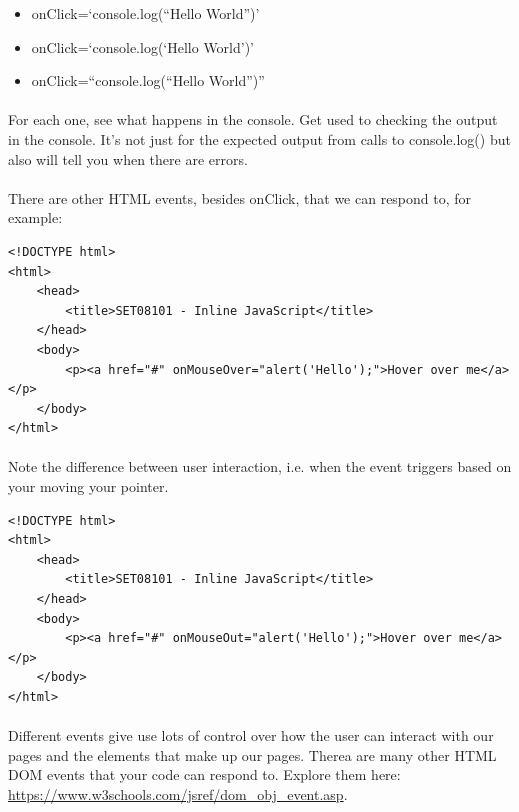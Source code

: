\documentclass[10pt, a4paper, twosize]{article}
\begin{document}
\begin{itemize}
\item onClick=`console.log(``Hello World'')'
\item onClick=`console.log(`Hello World')'
\item onClick=``console.log(``Hello World'')''
\end{itemize}

\paragraph{} For each one, see what happens in the console. Get used to checking the output in the console. It's not just for the expected output from calls to console.log() but also will tell you when there are errors.

\paragraph{} There are other HTML events, besides onClick, that we can respond to, for example:

\begin{lstlisting}
<!DOCTYPE html>
<html>
    <head>
        <title>SET08101 - Inline JavaScript</title>
    </head>
    <body>
        <p><a href="#" onMouseOver="alert('Hello');">Hover over me</a></p> 
    </body>
</html>
\end{lstlisting}

\paragraph{} Note the difference between user interaction, i.e. when the event triggers based on your moving your pointer.

\begin{lstlisting}
<!DOCTYPE html>
<html>
    <head>
        <title>SET08101 - Inline JavaScript</title>
    </head>
    <body>
        <p><a href="#" onMouseOut="alert('Hello');">Hover over me</a></p> 
    </body>
</html>
\end{lstlisting}

\paragraph{} Different events give use lots of control over how the user can interact with our pages and the elements that make up our pages. Therea are many other HTML DOM events that your code can respond to. Explore them here: \url{https://www.w3schools.com/jsref/dom_obj_event.asp}.
\end{document}
